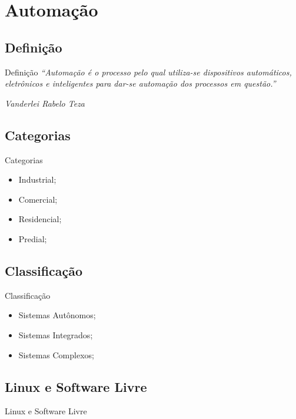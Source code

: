 \renewcommand{\titulo}{Automação}
\section{\titulo}

\renewcommand{\titulo}{Definição}
\subsection{\titulo}
\begin{frame}{\titulo}
\textit{``Automação é o processo pelo qual utiliza-se dispositivos automáticos, eletrônicos e inteligentes para dar-se automação dos processos em questão.''}
\begin{flushright}
\textit{Vanderlei Rabelo Teza}
\end{flushright}
\end{frame}

\renewcommand{\titulo}{Categorias}
\subsection{\titulo}
\begin{frame}{\titulo}
\begin{itemize}
\item Industrial;
\item Comercial;
\item Residencial;
\item Predial;
\end{itemize}
\end{frame}

\renewcommand{\titulo}{Classificação}
\subsection{\titulo}
\begin{frame}{\titulo}
\begin{itemize}
\item Sistemas Autônomos;
\item Sistemas Integrados;
\item Sistemas Complexos;
\end{itemize}
\end{frame}

\renewcommand{\titulo}{Linux e Software Livre}
\subsection{\titulo}
\begin{frame}{\titulo}
\end{frame}
